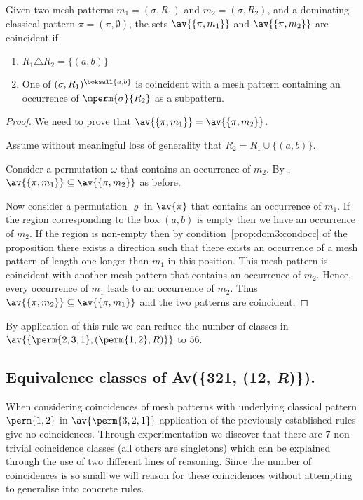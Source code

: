 \begin{proposition}
    \label{prop:dom3}
    Given two mesh patterns \(m_1 =(\sigma, R_1)\) and \(m_2 = (\sigma, R_2)\),
    and a dominating classical pattern \(\pi = (\pi,\emptyset)\), the sets
    \(\av{\{\pi,m_1\}}\) and \(\av{\{\pi,m_2\}}\) are coincident if
    \begin{enumerate}
        \item \(R_1 \triangle R_2 = \{(a,b)\}\)
        \item\label{prop:dom3:condocc} One of \((\sigma,R_1)^\boksall{a,b}\)
            is coincident with a mesh pattern containing an occurrence of
            \(\mperm{\sigma}{R_2}\) as a subpattern.
    \end{enumerate}
\end{proposition}
\begin{proof}
    We need to prove that \(\av{\{\pi,m_1\}} = \av{\{\pi,m_2\}}\).

    \noindent Assume without meaningful loss of generality that \(R_2 = R_1 \cup \{(a,b)\}\).

    Consider a permutation \(\omega\) that contains an occurrence of \(m_2\).
    By ,
     \(\av{\{\pi,m_1\}} \subseteq \av{\{\pi,m_2\}}\) as before.

    Now consider a permutation \(\varrho\) in \(\av{\pi}\) that contains an
    occurrence of \(m_1\). If the region corresponding to the box \((a,b)\)
    is empty then we have an occurrence of \(m_2\). If the region is non-empty
    then by condition~\ref{prop:dom3:condocc}  of the proposition there exists
    a direction such that there exists an occurrence of a mesh pattern of
    length one longer than \(m_1\) in this position. This mesh pattern is
    coincident with another mesh pattern that contains an
    occurrence of \(m_2\). Hence, every occurrence of \(m_1\) leads to an occurrence
    of \(m_2\).  Thus \(\av{\{\pi,m_2\}} \subseteq \av{\{\pi,m_1\}}\) and the
    two patterns are coincident.
\end{proof}

By application of this rule we can reduce the number of classes in
\(\av{\{\perm{2,3,1},(\perm{1,2}, R)\}}\) to \(56\).

\subsection{Equivalence classes of Av(\{321, (12, \textit{R})\}).}
When considering coincidences of mesh patterns with underlying classical
pattern \(\perm{1,2}\) in \(\av{\perm{3,2,1}}\) application of the previously
established rules give no coincidences. Through experimentation we discover
that there are \(7\) non-trivial coincidence classes (all others are singletons)
which can be explained through the
use of two different lines of reasoning. Since the number of coincidences is
so small we will reason for these coincidences without attempting to generalise
into concrete rules.

